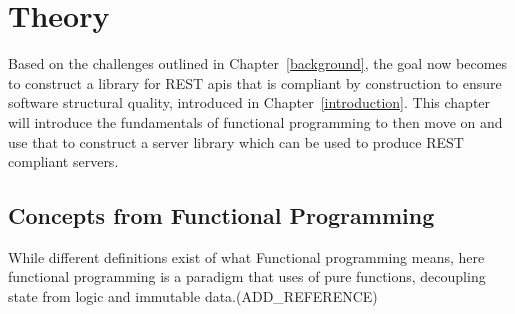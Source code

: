 \chapter{Theory}\label{theory} 

Based on the challenges outlined in Chapter~\ref{background}, the goal now
becomes to construct a library for REST apis that is compliant by construction
to ensure software structural quality, introduced in Chapter~\ref{introduction}.
This chapter will introduce the fundamentals of functional programming to then
move on and use that to construct a server library which can be used to produce
REST compliant servers.

\section{Concepts from Functional Programming}\label{functionalprogramming}

 While different definitions exist of what Functional programming means, here 
 functional programming is a paradigm that uses of pure functions,
 decoupling state from logic and immutable data.(ADD\_REFERENCE)

